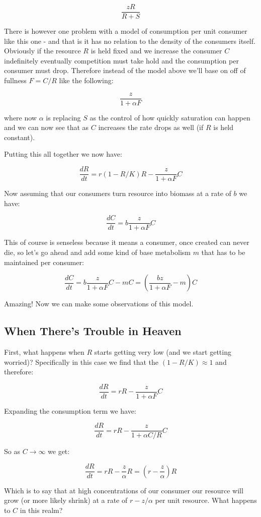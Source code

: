 \documentclass[11pt,a5paper]{book}
\begin{document}
$$\frac{zR}{R+S}$$

There is however one problem with a model of consumption per unit consumer like this one - and that is it has no relation to the density of the consumers itself. Obviously if the resource $R$ is held fixed and we increase the consumer $C$ indefinitely eventually competition must take hold and the consumption per consumer must drop. Therefore instead of the model above we'll base on off of fullness $F=C/R$ like the following:

$$\frac{z}{1+\alpha F}$$

where now $\alpha$ is replacing $S$ as the control of how quickly saturation can happen and we can now see that as $C$ increases the rate drops as well (if $R$ is held constant). 

Putting this all together we now have:

$$\frac{dR}{dt} = r(1-R/K)R-\frac{z}{1+\alpha F}C$$

Now assuming that our consumers turn resource into biomass at a rate of $b$ we have:

$$\frac{dC}{dt}=b\frac{z}{1+\alpha F}C$$

This of course is senseless because it means a consumer, once created can never die, so let's go ahead and add some kind of base metabolism $m$ that has to be maintained per consumer:

$$\frac{dC}{dt}=b\frac{z}{1+\alpha F}C-mC=\left(\frac{bz}{1+\alpha F} - m\right)C$$

Amazing! Now we can make some observations of this model. 

\subsection{When There's Trouble in Heaven}

First, what happens when $R$ starts getting very low (and we start getting worried)? Specifically in this case we find that the $(1-R/K) \approx 1$ and therefore:

$$\frac{dR}{dt} = rR-\frac{z}{1+\alpha F}C$$

Expanding the consumption term we have:

$$\frac{dR}{dt} = rR-\frac{z}{1+\alpha C/R}C$$

So as $C\rightarrow \infty$ we get:


$$\frac{dR}{dt} = rR-\frac{z}{\alpha}R=\left(r - \frac{z}{\alpha}\right)R$$

Which is to say that at high concentrations of our consumer our resource will grow (or more likely shrink) at a rate of $r-z/\alpha$ per unit resource. What happens to $C$ in this realm? 
\end{document}
